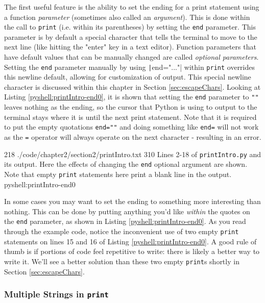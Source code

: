 \documentclass[oneside]{book}
\begin{document}
The first useful feature is the ability to set the ending for a print statement using a function \emph{parameter} (sometimes also called an \emph{argument}). This is done within the call to \texttt{print} (i.e. within its parentheses) by setting the \texttt{end} parameter. This parameter is by default a special character that tells the terminal to move to the next line (like hitting the "enter" key in a text editor). Function parameters that have default values that can be manually changed are called \textit{optional parameters}. Setting the \texttt{end} parameter manually by using \texttt|end="..."| within \texttt{print} overrides this newline default, allowing for customization of output. This special newline character is discussed within this chapter in Section \ref{sec:escapeChars}. Looking at Listing \ref{pyshell:printIntro-end0}, it is shown that setting the \texttt{end} parameter to \texttt{""} leaves nothing as the ending, so the cursor that Python is using to output to the terminal stays where it is until the next print statement. Note that it is required to put the empty quotations \texttt{end=""} and doing something like \texttt{end=} will not work as the \texttt{=} operator will always operate on the next character - resulting in an error.

{2}{18}
{./code/chapter2/section2/printIntro.txt}
{3}{10}
{Lines 2-18 of \texttt{printIntro.py} and its output. Here the effects of changing the \texttt{end} optional argument are shown. Note that empty \texttt{print} statements here print a blank line in the output.}
{pyshell:printIntro-end0}

In some cases you may want to set the ending to something more interesting than nothing. This can be done by putting anything you'd like \textit{within} the quotes on the \texttt{end} parameter, as shown in Listing \ref{pyshell:printIntro-end0}. As you read through the example code, notice the inconvenient use of two empty \texttt{print} statements on lines 15 and 16 of Listing \ref{pyshell:printIntro-end0}. A good rule of thumb is if portions of code feel repetitive to write: there is likely a better way to write it. We'll see a better solution than these two empty \texttt{print}s shortly in Section \ref{sec:escapeChars}.

\subsubsection{Multiple Strings in \texttt{print}}\label{sec:printMulti}
\end{document}
